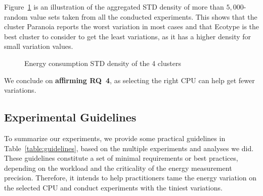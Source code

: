 Figure~\ref{fig:cpugen} is an illustration of the aggregated STD density of more than $5,000$-random value sets taken from all the conducted experiments.
This shows that the cluster \textsf{Paranoia} reports the worst variation in most cases and that \textsf{Ecotype} is the best cluster to consider to get the least variations, as it has a higher density for small variation values.

\begin{figure}
    \caption{Energy consumption STD density of the 4 clusters}\label{fig:cpugen}
\end{figure}

\begin{mdframed}[skipabove=\topsep,skipbelow=\topsep]
    We conclude on \textbf{affirming \textsc{RQ}~4}, as selecting the right CPU can help get fewer variations.
\end{mdframed}


\subsection{Experimental Guidelines}
To summarize our experiments, we provide some practical guidelines in Table~\ref{table:guidelines}, based on the multiple experiments and analyses we did.
These guidelines constitute a set of minimal requirements or best practices, depending on the workload and the criticality of the energy measurement precision.
Therefore, it intends to help practitioners tame the energy variation on the selected CPU and conduct experiments with the tiniest variations.

